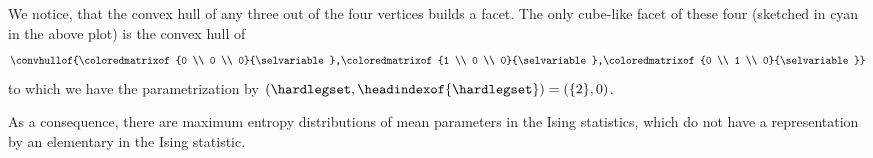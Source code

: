 \begin{example}
\begin{center}
\begin{tikzpicture}[tdplot_main_coords, scale=2,
            mainline/.style={thick},
            invisibleline/.style={dashed, gray}
        ]
        \end{tikzpicture}
    \end{center}
    We notice, that the convex hull of any three out of the four vertices builds a facet.
    The only cube-like facet of these four (sketched in cyan in the above plot) is the convex hull of
    \begin{align*}
        \convhullof{\coloredmatrixof{0 \\ 0 \\ 0}{\selvariable},\coloredmatrixof{1 \\ 0 \\ 0}{\selvariable},\coloredmatrixof{0 \\ 1 \\ 0}{\selvariable}}
    \end{align*}
    to which we have the parametrization by $(\hardlegset,\headindexof{\hardlegset})=(\{2\},0)$.

    As a consequence, there are maximum entropy distributions of mean parameters in the Ising statistics, which do not have a representation by an elementary \CompActNet{} in the Ising statistic.
\end{example}